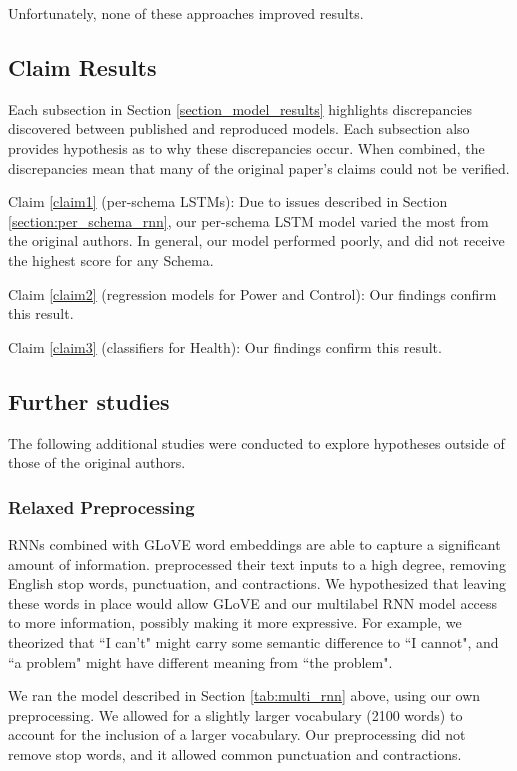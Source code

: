 \documentclass[11pt,a4paper]{article}
\begin{document}
Unfortunately, none of these approaches improved results.

\subsection{Claim Results}
Each subsection in Section \ref{section_model_results} highlights discrepancies discovered between published and reproduced models. Each subsection also provides hypothesis as to why these discrepancies occur. When combined, the discrepancies mean that many of the original paper's claims could not be verified. 

Claim \ref{claim1} (per-schema LSTMs): Due to issues described in Section \ref{section:per_schema_rnn}, our per-schema LSTM model varied the most from the original authors. In general, our model performed poorly, and did not receive the highest score for any Schema.  

Claim \ref{claim2} (regression models for Power and Control): Our findings confirm this result. 

Claim \ref{claim3} (classifiers for Health): Our findings confirm this result. 

\subsection{Further studies}
\label{further_studies}
The following additional studies were conducted to explore hypotheses outside of those of the original authors. 
\subsubsection{Relaxed Preprocessing}
\label{section:relaxed_preprocessing}
RNNs combined with GLoVE word embeddings are able to capture a significant amount of information. \citeauthor{burger_2021} preprocessed their text inputs to a high degree, removing English stop words, punctuation, and contractions. We hypothesized that leaving these words in place would allow GLoVE and our multilabel RNN model access to more information, possibly making it more expressive. For example, we theorized that ``I can't" might carry some semantic difference to ``I cannot", and ``a problem" might have different meaning from ``the problem". 

We ran the model described in Section \ref{tab:multi_rnn} above, using our own preprocessing. We allowed for a slightly larger vocabulary (2100 words) to account for the inclusion of a larger vocabulary. Our preprocessing did not remove stop words, and it allowed common punctuation and contractions. 
\end{document}
